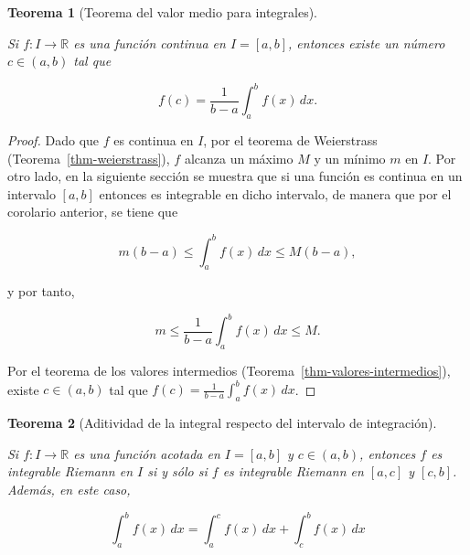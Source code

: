 \documentclass[
  a4paper,
]{scrreport}
\theoremstyle{plain}
\newtheorem{theorem}{Teorema}[chapter]
\theoremstyle{definition}
\theoremstyle{plain}
\theoremstyle{plain}
\theoremstyle{definition}
\theoremstyle{definition}
\theoremstyle{remark}
\begin{document}
\begin{theorem}[Teorema del valor medio para
integrales]\protect\hypertarget{thm-valor-medio-integral}{}\label{thm-valor-medio-integral}

Si \(f:I\to\mathbb{R}\) es una función continua en \(I=[a,b]\), entonces
existe un número \(c\in(a,b)\) tal que

\[
f(c) = \frac{1}{b-a}\int_a^b f(x)\,dx.
\]

\end{theorem}

\begin{tcolorbox}[enhanced jigsaw, titlerule=0mm, arc=.35mm, colframe=quarto-callout-note-color-frame, bottomrule=.15mm, opacitybacktitle=0.6, rightrule=.15mm, coltitle=black, colback=white, toprule=.15mm, title=\textcolor{quarto-callout-note-color}{\faInfo}\hspace{0.5em}{Demostración}, leftrule=.75mm, bottomtitle=1mm, opacityback=0, breakable, colbacktitle=quarto-callout-note-color!10!white, toptitle=1mm, left=2mm]

\begin{proof}
Dado que \(f\) es continua en \(I\), por el teorema de Weierstrass
(Teorema~\ref{thm-weierstrass}), \(f\) alcanza un máximo \(M\) y un
mínimo \(m\) en \(I\). Por otro lado, en la siguiente sección se muestra
que si una función es continua en un intervalo \([a,b]\) entonces es
integrable en dicho intervalo, de manera que por el corolario anterior,
se tiene que

\[
m(b-a)\leq \int_a^b f(x)\,dx \leq M(b-a), 
\]

y por tanto,

\[
m\leq \frac{1}{b-a}\int_a^b f(x)\,dx \leq M.
\]

Por el teorema de los valores intermedios
(Teorema~\ref{thm-valores-intermedios}), existe \(c\in(a,b)\) tal que
\(f(c)=\frac{1}{b-a}\int_a^b f(x)\,dx\).
\end{proof}

\end{tcolorbox}

\begin{theorem}[Aditividad de la integral respecto del intervalo de
integración]\protect\hypertarget{thm-aditividad-integral-intervalo}{}\label{thm-aditividad-integral-intervalo}

Si \(f:I\to\mathbb{R}\) es una función acotada en \(I=[a,b]\) y
\(c\in(a,b)\), entonces \(f\) es integrable Riemann en \(I\) si y sólo
si \(f\) es integrable Riemann en \([a,c]\) y \([c,b]\). Además, en este
caso,

\[
\int_a^b f(x)\,dx = \int_a^c f(x)\,dx + \int_c^b f(x)\,dx
\]

\end{theorem}
\end{document}
